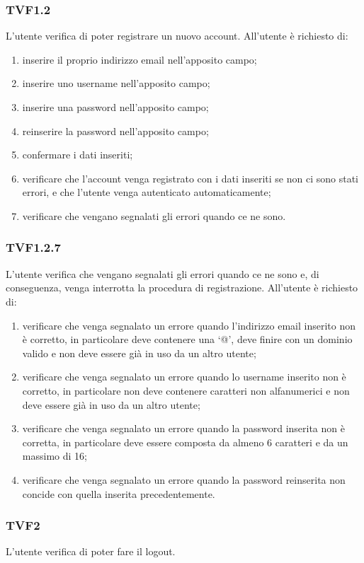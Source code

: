 		\subsubsection{TVF1.2}
			L'utente verifica di poter registrare un nuovo account.
			All'utente è richiesto di:
			\begin{enumerate}
				\item inserire il proprio indirizzo email nell'apposito campo;
				\item inserire uno username nell'apposito campo;
				\item inserire una password nell'apposito campo;
				\item reinserire la password nell'apposito campo;
				\item confermare i dati inseriti;
				\item verificare che l'account venga registrato con i dati inseriti se non ci sono stati errori, e che l'utente venga autenticato automaticamente;
				\item verificare che vengano segnalati gli errori quando ce ne sono.
			\end{enumerate}
		\subsubsection{TVF1.2.7}
			L'utente verifica che vengano segnalati gli errori quando ce ne sono e, di conseguenza, venga interrotta la procedura di registrazione.
			All'utente è richiesto di:
			\begin{enumerate}
				\item verificare che venga segnalato un errore quando l'indirizzo email inserito non è corretto, in particolare deve contenere una `@', deve finire con un dominio valido e non deve essere già in uso da un altro utente;
				\item verificare che venga segnalato un errore quando lo username inserito non è corretto, in particolare non deve contenere caratteri non alfanumerici e non deve essere già in uso da un altro utente;
				\item verificare che venga segnalato un errore quando la password inserita non è corretta, in particolare deve essere composta da almeno 6 caratteri e da un massimo di 16;
				\item verificare che venga segnalato un errore quando la password reinserita non concide con quella inserita precedentemente.
			\end{enumerate}
		\subsubsection{TVF2}
			L'utente verifica di poter fare il logout.
